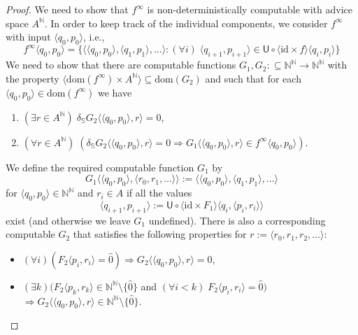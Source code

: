 \documentclass[11pt,a4paper]{amsart}
\theoremstyle{plain}
\theoremstyle{definition}
\theoremstyle{defC}
\theoremstyle{thmC}
\theoremstyle{plain}
\numberwithin{equation}{section}
\def\IN{{\mathbb{N}}}
\def\IS{{\mathbb{S}}}
\def\TO{\Longrightarrow}
\def\In{\subseteq}
\def\U{{\mathsf{{U}}}}
\def\id{{\mathrm{id}}}
\def\dom{{\mathrm{dom}}}
\begin{document}
\begin{proof}
We need to show that $f^\infty$ is non-deterministically computable with advice space $A^\IN$.
In order to keep track of the individual components, we consider $f^\infty$ with input $\langle q_0,p_0\rangle$, i.e.,
\[f^\infty\langle q_0,p_0\rangle=\{\langle\langle q_0,p_0\rangle,\langle q_1,p_1\rangle,...\rangle:
(\forall i)\;\langle q_{i+1},p_{i+1}\rangle\in\U\circ\langle\id\times f\rangle\langle q_i,p_i\rangle\}\]
We need to show that there are computable functions $G_1,G_2:\In\IN^\IN\to\IN^\IN$ 
with the property
$\langle \dom(f^\infty)\times A^\IN\rangle\In\dom(G_2)$ and such that for each $\langle q_0,p_0\rangle\in\dom(f^\infty)$ we have
\begin{enumerate}
\item $(\exists r\in A^\IN)\;\delta_\IS G_2\langle\langle q_0,p_0\rangle,r\rangle=0$,
\item $(\forall r\in A^\IN)\;(\delta_\IS G_2\langle \langle q_0,p_0\rangle,r\rangle=0\TO G_1\langle \langle q_0,p_0\rangle,r\rangle\in f^\infty\langle q_0,p_0\rangle)$.
\end{enumerate}
We define the required computable function $G_1$ by
\[G_1\langle\langle q_0,p_0\rangle,\langle r_0,r_1,...\rangle\rangle:=\langle\langle q_0,p_0\rangle,\langle q_1,p_1\rangle,...\rangle\]
for $\langle q_0,p_0\rangle\in\IN^\IN$ and $r_i\in A$ if all the values
\[\langle q_{i+1},p_{i+1}\rangle:=\U\circ\langle\id\times F_1\rangle\langle q_i,\langle p_i,r_i\rangle\rangle\]
exist (and otherwise we leave $G_1$ undefined). There is also a corresponding computable $G_2$ that satisfies
the following properties for $r:=\langle r_0,r_1,r_2,...\rangle$:
\begin{itemize}
\item $(\forall i)(F_2\langle p_i,r_i\rangle=\widehat{0})\TO G_2\langle\langle q_0,p_0\rangle,r\rangle=\widehat{0}$,
\item $(\exists k)(F_2\langle p_k,r_k\rangle\in\IN^\IN\setminus\{\widehat{0}\}$ and $(\forall i<k)\;F_2\langle p_i,r_i\rangle=\widehat{0})$\\ $\TO G_2\langle\langle q_0,p_0\rangle,r\rangle\in\IN^\IN\setminus\{\widehat{0}\}$.
\end{itemize}


\end{proof}
\end{document}
